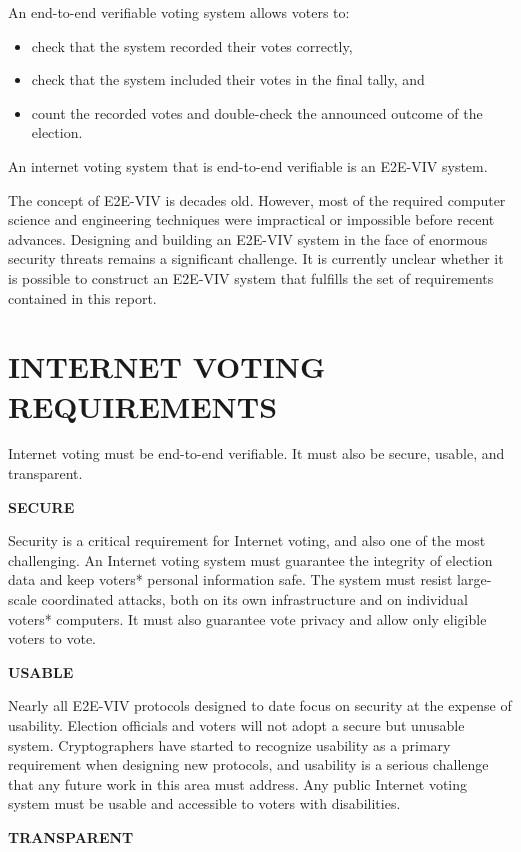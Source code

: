 An end-to-end verifiable voting system allows voters to:
\begin{itemize}
\item check that the system recorded their votes correctly,
\item check that the system included their votes in the final tally,
  and
\item count the recorded votes and double-check the announced outcome
  of the election.
\end{itemize}

An internet voting system that is end-to-end verifiable is an E2E-VIV
system.

The concept of E2E-VIV is decades old. However, most of the required
computer science and engineering techniques were impractical or
impossible before recent advances. Designing and building an E2E-VIV
system in the face of enormous security threats remains a significant
challenge. It is currently unclear whether it is possible to construct
an E2E-VIV system that fulfills the set of requirements contained in
this report.

\section*{INTERNET VOTING REQUIREMENTS}

Internet voting must be end-to-end verifiable. It must also be secure,
usable, and transparent.

\noindent \textbf{SECURE}

Security is a critical requirement for Internet voting, and also one
of the most challenging. An Internet voting system must guarantee the
integrity of election data and keep voters* personal information
safe. The system must resist large-scale coordinated attacks, both on
its own infrastructure and on individual voters* computers. It must
also guarantee vote privacy and allow only eligible voters to vote.

\noindent \textbf{USABLE}

Nearly all E2E-VIV protocols designed to date focus on security at the
expense of usability. Election officials and voters will not adopt a
secure but unusable system. Cryptographers have started to recognize
usability as a primary requirement when designing new protocols, and
usability is a serious challenge that any future work in this area
must address. Any public Internet voting system must be usable and
accessible to voters with disabilities.

\noindent \textbf{TRANSPARENT}

